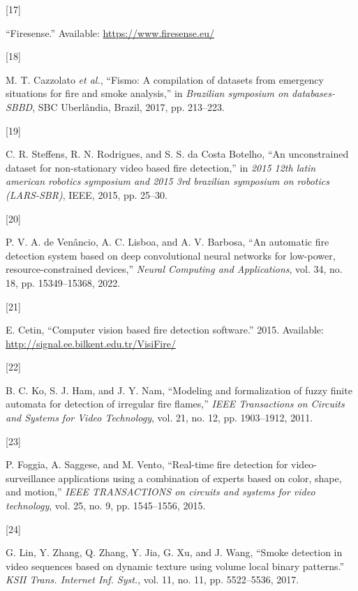 \documentclass[
  10pt,
]{article}
\newlength{\cslhangindent}
\newlength{\csllabelwidth}
\newenvironment{CSLReferences}[2] %
 {\begin{list}{}{%
  \setlength{\itemindent}{0pt}
  \setlength{\leftmargin}{0pt}
  \setlength{\parsep}{0pt}
  \ifodd #1
   \setlength{\leftmargin}{\cslhangindent}
   \setlength{\itemindent}{-1\cslhangindent}
  \fi
  \setlength{\itemsep}{#2\baselineskip}}}
 {\end{list}}
\newcommand{\CSLLeftMargin}[1]{\parbox[t]{\csllabelwidth}{\strut#1\strut}}
\newcommand{\CSLRightInline}[1]{\parbox[t]{\linewidth - \csllabelwidth}{\strut#1\strut}}
\begin{document}
\begin{CSLReferences}{0}{0}
\CSLLeftMargin{{[}17{]} }%
\CSLRightInline{{``Firesense.''} Available:
\url{https://www.firesense.eu/}}

\CSLLeftMargin{{[}18{]} }%
\CSLRightInline{M. T. Cazzolato \emph{et al.}, {``Fismo: A compilation
of datasets from emergency situations for fire and smoke analysis,''} in
\emph{Brazilian symposium on databases-SBBD}, SBC Uberl{â}ndia, Brazil,
2017, pp. 213--223.}

\CSLLeftMargin{{[}19{]} }%
\CSLRightInline{C. R. Steffens, R. N. Rodrigues, and S. S. da Costa
Botelho, {``An unconstrained dataset for non-stationary video based fire
detection,''} in \emph{2015 12th latin american robotics symposium and
2015 3rd brazilian symposium on robotics (LARS-SBR)}, IEEE, 2015, pp.
25--30.}

\CSLLeftMargin{{[}20{]} }%
\CSLRightInline{P. V. A. de Venâncio, A. C. Lisboa, and A. V. Barbosa,
{``An automatic fire detection system based on deep convolutional neural
networks for low-power, resource-constrained devices,''} \emph{Neural
Computing and Applications}, vol. 34, no. 18, pp. 15349--15368, 2022.}

\CSLLeftMargin{{[}21{]} }%
\CSLRightInline{E. Cetin, {``Computer vision based fire detection
software.''} 2015. Available:
\url{http://signal.ee.bilkent.edu.tr/VisiFire/}}

\CSLLeftMargin{{[}22{]} }%
\CSLRightInline{B. C. Ko, S. J. Ham, and J. Y. Nam, {``Modeling and
formalization of fuzzy finite automata for detection of irregular fire
flames,''} \emph{IEEE Transactions on Circuits and Systems for Video
Technology}, vol. 21, no. 12, pp. 1903--1912, 2011.}

\CSLLeftMargin{{[}23{]} }%
\CSLRightInline{P. Foggia, A. Saggese, and M. Vento, {``Real-time fire
detection for video-surveillance applications using a combination of
experts based on color, shape, and motion,''} \emph{IEEE TRANSACTIONS on
circuits and systems for video technology}, vol. 25, no. 9, pp.
1545--1556, 2015.}

\CSLLeftMargin{{[}24{]} }%
\CSLRightInline{G. Lin, Y. Zhang, Q. Zhang, Y. Jia, G. Xu, and J. Wang,
{``Smoke detection in video sequences based on dynamic texture using
volume local binary patterns.''} \emph{KSII Trans. Internet Inf. Syst.},
vol. 11, no. 11, pp. 5522--5536, 2017.}


\end{CSLReferences}
\end{document}

